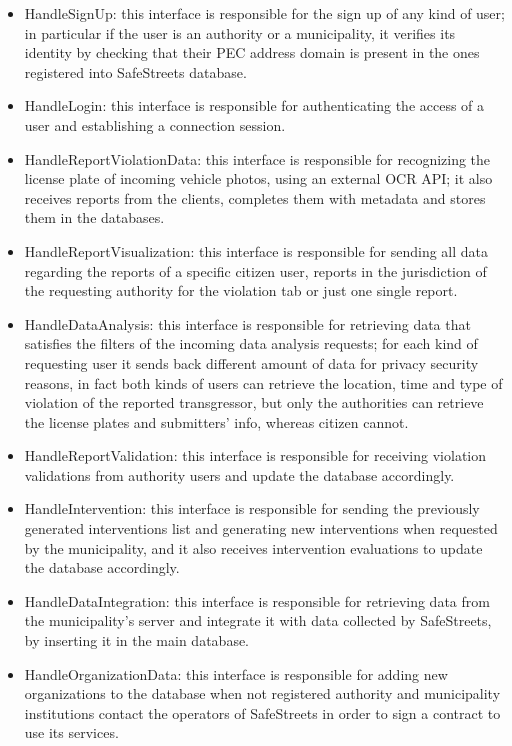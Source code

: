 \begin{itemize}
	\item HandleSignUp: this interface is responsible for the sign up of any kind of user; in particular if the user is an authority or a municipality, it verifies its identity by checking that their PEC address domain is present in the ones registered into SafeStreets database.
	\item HandleLogin: this interface is responsible for authenticating the access of a user and establishing a connection session.
	\item HandleReportViolationData: this interface is responsible for recognizing the license plate of incoming vehicle photos, using an external OCR API; it also receives reports from the clients, completes them with metadata and stores them in the databases.
	\item HandleReportVisualization: this interface is responsible for sending all data regarding the reports of a specific citizen user, reports in the jurisdiction of the requesting authority for the violation tab or just one single report.
	\item HandleDataAnalysis: this interface is responsible for retrieving data that satisfies the filters of the incoming data analysis requests; for each kind of requesting user it sends back different amount of data for privacy security reasons, in fact both kinds of users can retrieve the location, time and type of violation of the reported transgressor, but only the authorities can retrieve the license plates and submitters' info, whereas citizen cannot.
	\item HandleReportValidation: this interface is responsible for receiving violation validations from authority users and update the database accordingly.
	\item HandleIntervention: this interface is responsible for sending the previously generated interventions list and generating new interventions when requested by the municipality, and it also receives intervention evaluations to update the database accordingly.
	\item HandleDataIntegration: this interface is responsible for retrieving data from the municipality's server and integrate it with data collected by SafeStreets, by inserting it in the main database.
	\item HandleOrganizationData: this interface is responsible for adding new organizations to the database when not registered authority and municipality institutions contact the operators of SafeStreets in order to sign a contract to use its services.
\end{itemize}